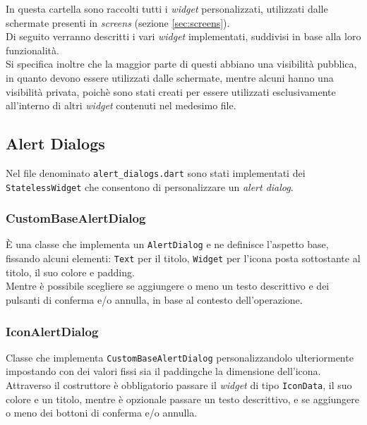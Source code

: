 In questa cartella sono raccolti tutti i \emph{widget} personalizzati, utilizzati dalle schermate presenti in \emph{screens} (sezione \ref{sec:screens}).\\
Di seguito verranno descritti i vari \emph{widget} implementati, suddivisi in base alla loro funzionalità.\\
Si specifica inoltre che la maggior parte di questi abbiano una visibilità pubblica, in quanto devono essere utilizzati dalle schermate, mentre alcuni hanno una visibilità privata, poichè sono stati creati per essere utilizzati esclusivamente all'interno di altri \emph{widget} contenuti nel medesimo file.

\subsection{Alert Dialogs}
\label{subsec:alert-dialogs}

Nel file denominato \lstinline{alert_dialogs.dart} sono stati implementati dei \lstinline{StatelessWidget} che consentono di personalizzare un \emph{alert dialog}.

\subsubsection*{CustomBaseAlertDialog}
\label{subsubsec:custom-base-alert-dialog}

È una classe che implementa un \lstinline{AlertDialog}\cite{site:alert-dialog} e ne definisce l'aspetto base, fissando alcuni elementi: \lstinline{Text}\cite{site:text} per il titolo, \lstinline{Widget} per l'icona posta sottostante al titolo, il suo colore e \gls{padding}\glsoccur.\\
Mentre è possibile scegliere se aggiungere o meno un testo descrittivo e dei pulsanti di conferma e/o annulla, in base al contesto dell'operazione.

\subsubsection*{IconAlertDialog}
\label{subsubsec:icon-alert-dialog}

Classe che implementa \lstinline{CustomBaseAlertDialog} personalizzandolo ulteriormente impostando con dei valori fissi sia il \gls{padding}\glsoccur che la dimensione dell'icona.\\
Attraverso il costruttore è obbligatorio passare il \emph{widget} di tipo \lstinline{IconData}\cite{site:icon-data}, il suo colore e un titolo, mentre è opzionale passare un testo descrittivo, e se aggiungere o meno dei bottoni di conferma e/o annulla.

